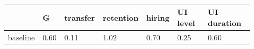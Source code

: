 \begin{tabular}{lllllll}
\toprule
 & \textbf{G} & \textbf{transfer} & \textbf{retention} & \textbf{hiring} & \textbf{UI level} & \textbf{UI duration} \\
\midrule
baseline & 0.60 & 0.11 & 1.02 & 0.70 & 0.25 & 0.60 \\
\bottomrule
\end{tabular}
